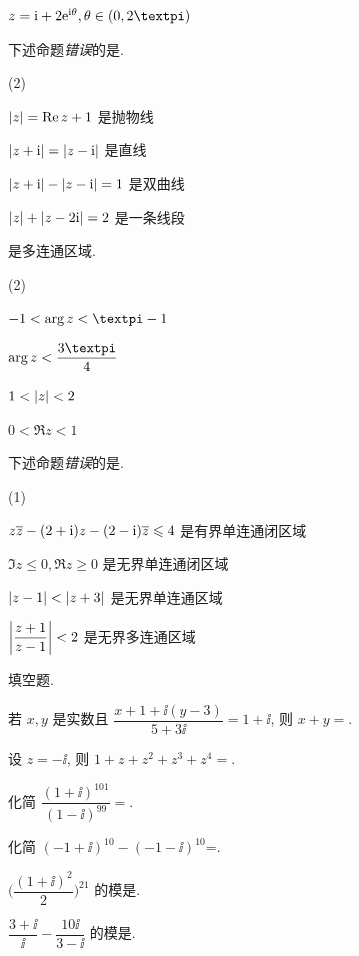 \begin{homework}
\begin{homework}
\begin{exchoice}
      \item $z=\ii+2\ee^{\ii\theta},\theta\in(0,2\cpi)$
    \end{exchoice}
    \item 下述命题\emph{错误}的是\fillbrace{}.
    \begin{exchoice}(2)
      \item $\lvert z\rvert=\operatorname{Re} z+1$ 是抛物线
      \item $\lvert z+\mathrm{i}\rvert=\lvert z-\mathrm{i}\rvert$ 是直线
      \item $\lvert z+\mathrm{i}\rvert-\lvert z-\mathrm{i}\rvert=1$ 是双曲线
      \item $\lvert z\rvert+\lvert z-2\mathrm{i}\rvert=2$ 是一条线段
    \end{exchoice}
    \item \fillbrace{}是多连通区域.
    \begin{exchoice}(2)
      \item $-1<\arg z<\cpi-1$
      \item $\arg z<\dfrac{3\cpi}4$
      \item $1<\lvert z\rvert<2$
      \item $0<\Re z<1$
    \end{exchoice}
    \item 下述命题\emph{错误}的是\fillbrace{}.
    \begin{exchoice}(1)
      \item $z\overline z-(2+\mathrm{i})z-(2-\mathrm{i})\overline z\leqslant 4$ 是有界单连通闭区域
      \item $\Im z\le0,\Re z\ge0$ 是无界单连通闭区域
      \item $\lvert z-1\rvert<\lvert z+3\rvert$ 是无界单连通区域
      \item $\biggl\vert\dfrac{z+1}{z-1}\biggr\vert<2$ 是无界多连通区域
    \end{exchoice}
  \end{homework}
  \item 填空题.
  \begin{homework}
    \item 若 $x,y$ 是实数且 $\dfrac{x+1+\ii(y-3)}{5+3\ii}=1+\ii$, 则 $x+y=$\fillblank{}.
    \item 设 $z=-\ii$, 则 $1+z+z^2+z^3+z^4=$\fillblank{}.
    \item 化简 $\dfrac{(1+\ii)^{101}}{(1-\ii)^{99}}=$\fillblank{}.
    \item 化简 $(-1+\ii)^{10}-(-1-\ii)^{10}$=\fillblank{}.
    \item $\biggl(\dfrac{(1+\ii)^2}2\biggr)^{21}$ 的模是\fillblank{}.
    \item $\dfrac{3+\ii}{\ii}-\dfrac{10\ii}{3-\ii}$ 的模是\fillblank{}.

\end{homework}
\end{homework}
